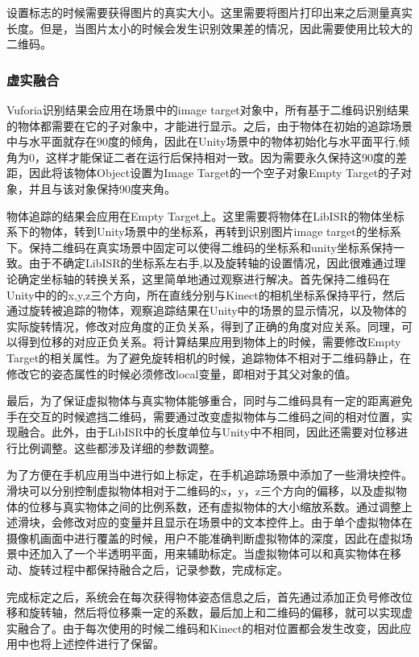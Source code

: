 设置标志的时候需要获得图片的真实大小。这里需要将图片打印出来之后测量真实长度。但是，当图片太小的时候会发生识别效果差的情况，因此需要使用比较大的二维码。

\subsubsection{虚实融合}
Vuforia识别结果会应用在场景中的image target对象中，所有基于二维码识别结果的物体都需要在它的子对象中，才能进行显示。之后，由于物体在初始的追踪场景中与水平面就存在90度的倾角，因此在Unity场景中的物体初始化与水平面平行,倾角为0，这样才能保证二者在运行后保持相对一致。因为需要永久保持这90度的差距，因此将该物体Object设置为Image Target的一个空子对象Empty Target的子对象，并且与该对象保持90度夹角。

物体追踪的结果会应用在Empty Target上。这里需要将物体在LibISR的物体坐标系下的物体，转到Unity场景中的坐标系，再转到识别图片image target的坐标系下。保持二维码在真实场景中固定可以使得二维码的坐标系和unity坐标系保持一致。由于不确定LibISR的坐标系左右手,以及旋转轴的设置情况，因此很难通过理论确定坐标轴的转换关系，这里简单地通过观察进行解决。首先保持二维码在Unity中的的x,y,z三个方向，所在直线分别与Kinect的相机坐标系保持平行，然后通过旋转被追踪的物体，观察追踪结果在Unity中的场景的显示情况，以及物体的实际旋转情况，修改对应角度的正负关系，得到了正确的角度对应关系。同理，可以得到位移的对应正负关系。将计算结果应用到物体上的时候，需要修改Empty Target的相关属性。为了避免旋转相机的时候，追踪物体不相对于二维码静止，在修改它的姿态属性的时候必须修改local变量，即相对于其父对象的值。

最后，为了保证虚拟物体与真实物体能够重合，同时与二维码具有一定的距离避免手在交互的时候遮挡二维码，需要通过改变虚拟物体与二维码之间的相对位置，实现融合。此外，由于LibISR中的长度单位与Unity中不相同，因此还需要对位移进行比例调整。这些都涉及详细的参数调整。

为了方便在手机应用当中进行如上标定，在手机追踪场景中添加了一些滑块控件。滑块可以分别控制虚拟物体相对于二维码的x，y，z三个方向的偏移，以及虚拟物体的位移与真实物体之间的比例系数，还有虚拟物体的大小缩放系数。通过调整上述滑块，会修改对应的变量并且显示在场景中的文本控件上。由于单个虚拟物体在摄像机画面中进行覆盖的时候，用户不能准确判断虚拟物体的深度，因此在虚拟场景中还加入了一个半透明平面，用来辅助标定。当虚拟物体可以和真实物体在移动、旋转过程中都保持融合之后，记录参数，完成标定。

完成标定之后，系统会在每次获得物体姿态信息之后，首先通过添加正负号修改位移和旋转轴，然后将位移乘一定的系数，最后加上和二维码的偏移，就可以实现虚实融合了。由于每次使用的时候二维码和Kinect的相对位置都会发生改变，因此应用中也将上述控件进行了保留。


